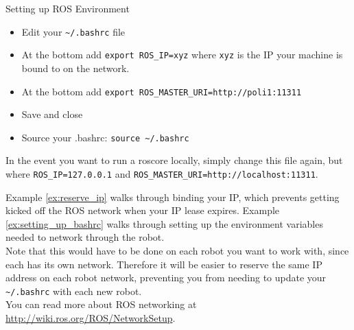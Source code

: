 \begin{example}{Setting up ROS Environment}\label{ex:setting_up_bashrc}
\begin{itemize}
  \item Edit your \texttt{\textasciitilde/.bashrc} file
  \item At the bottom add \texttt{export ROS\_IP=xyz} where \texttt{xyz} is the IP your machine is bound to on the network.
  \item At the bottom add \texttt{export ROS\_MASTER\_URI=http://poli1:11311}
  \item Save and close
  \item Source your .bashrc: \texttt{source \textasciitilde/.bashrc}
\end{itemize}
  In the event you want to run a roscore locally, simply change this file again, but where \texttt{ROS\_IP=127.0.0.1} and \texttt{ROS\_MASTER\_URI=http://localhost:11311}.
\end{example}

Example \ref{ex:reserve_ip} walks through binding your IP, which prevents getting kicked off the ROS network when your IP lease expires. 
Example \ref{ex:setting_up_bashrc} walks through setting up the environment variables needed to network through the robot. \\

Note that this would have to be done on each robot you want to work with, since each has its own network. 
Therefore it will be easier to reserve the same IP address on each robot network, preventing you from needing to update your \texttt{\textasciitilde/.bashrc} with each new robot. \\


You can read more about ROS networking at \href{http://wiki.ros.org/ROS/NetworkSetup}{http://wiki.ros.org/ROS/NetworkSetup}.
